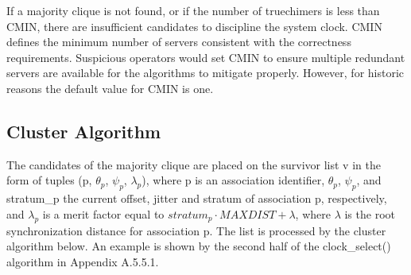 \begin{enumerate}
    If a majority clique is not found, or if the number of truechimers is
    less than CMIN, there are insufficient candidates to discipline the
    system clock. CMIN defines the minimum number of servers consistent
    with the correctness requirements. Suspicious operators would set
    CMIN to ensure multiple redundant servers are available for the
    algorithms to mitigate properly. However, for historic reasons the
    default value for CMIN is one.
\end{enumerate}

\subsection{Cluster Algorithm}
\label{section-11-2-2}

The candidates of the majority clique are placed on the survivor list
v in the form of tuples (p, $ \theta_p $, $ \psi_p $, $ \lambda_p $), where p is an
association identifier, $ \theta_p $, $ \psi_p $, and stratum\_p the current
offset, jitter and stratum of association p, respectively, and
$ \lambda_p $ is a merit factor equal to $ stratum_p \cdot MAXDIST + \lambda $,
where $ \lambda $ is the root synchronization distance for association p.
The list is processed by the cluster algorithm below. An example is
shown by the second half of the clock\_select() algorithm in
Appendix A.5.5.1.

